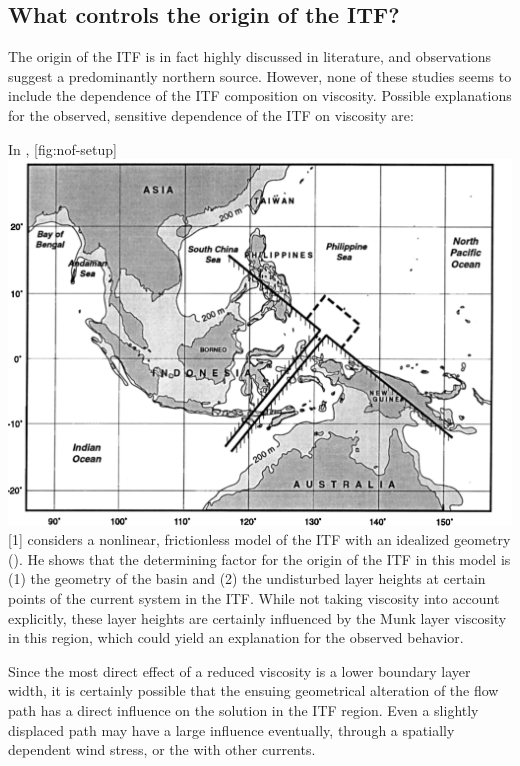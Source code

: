 \subsection{What controls the origin of the \acl{ITF}?}
\label{sec:outro-itf-origin}
The origin of the \ac{ITF} is in fact highly discussed in literature, and observations suggest a predominantly northern source. However, none of these studies seems to include the dependence of the \ac{ITF} composition on viscosity. Possible explanations for the observed, sensitive dependence of the \ac{ITF} on viscosity are:
%
\begin{items}
	\item In \cite{nofind}, %
	[fig:nof-setup]{%
		\includegraphics[width=\marginparwidth]{figures/outro/nof}%
	}[1]%
	considers a nonlinear, frictionless model of the \ac{ITF} with an idealized geometry (). He shows that the determining factor for the origin of the \ac{ITF} in this model is (1) the geometry of the basin and (2) the undisturbed layer heights at certain points of the current system in the \ac{ITF}. While not taking viscosity into account explicitly, these layer heights are certainly influenced by the Munk layer viscosity in this region, which could yield an explanation for the observed behavior.
	\item Since the most direct effect of a reduced viscosity is a lower boundary layer width, it is certainly possible that the ensuing geometrical alteration of the flow path has a direct influence on the solution in the \ac{ITF} region. Even a slightly displaced path may have a large influence eventually, \eg through a spatially dependent wind stress, or the  with other currents.

\end{items}
